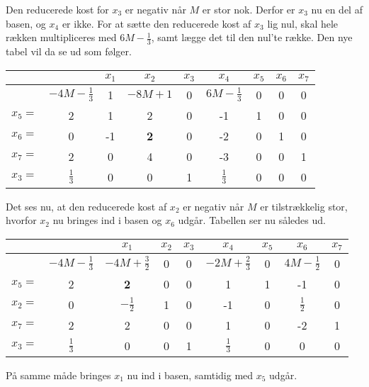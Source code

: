 \begin{eks}
Den reducerede kost for $x_3$ er negativ når $M$ er stor nok. 
Derfor er $x_3$ nu en del af basen, og $x_4$ er ikke. 
For at sætte den reducerede kost af $x_3$ lig nul, skal hele rækken multipliceres med $6M- \frac{1}{3}$, samt lægge det til den nul'te række. 
Den nye tabel vil da se ud som følger.

\begin{center}
\begin{tabular}{|c|c|ccccccc|}
\hline
	 &  & $x_1$ & $x_2$ & $x_3$ & $x_4$ & $x_5$ & $x_6$ & $x_7$ \\
\hline
	 & $-4M- \frac{1}{3}$ & 1 & $-8M+1$ & 0 & $6M- \frac{1}{3}$ & 0 & 0 & 0 \\
\hline
	$x_5=$ & 2 	  & 1  & 2		    & 0 & -1 & 1 & 0 & 0 \\
	$x_6=$ & 0 	  & -1 & \textbf{2} & 0 & -2 & 0 & 1 & 0 \\
	$x_7=$ & 2	  & 0  & 4 		 & 0 & -3 & 0 & 0 & 1 \\
	$x_3=$ & $\frac{1}{3}$ & 0 	 & 0 & 1  & $\frac{1}{3}$ & 0 & 0 & 0 \\
\hline
\end{tabular}
\end{center}

Det ses nu, at den reducerede kost af $x_2$ er negativ når $M$ er tilstrækkelig stor, hvorfor $x_2$ nu bringes ind i basen og $x_6$ udgår. 
Tabellen ser nu således ud.

\begin{center}
\begin{tabular}{|c|c|ccccccc|}
\hline
	 &  & $x_1$ & $x_2$ & $x_3$ & $x_4$ & $x_5$ & $x_6$ & $x_7$ \\
\hline
	 & $-4M- \frac{1}{3}$ & $-4M+ \frac{3}{2}$ & 0 & 0 & $-2M+ \frac{2}{3}$ & 0 & $4M- \frac{1}{2}$ & 0 \\
\hline
	$x_5=$ & 2 & \textbf{2} & 0 & 0 & 1 & 1 & -1 & 0 \\
	$x_2=$ & 0 & $- \frac{1}{2}$ & 1 & 0 & -1 & 0 & $\frac{1}{2}$ & 0 \\
	$x_7=$ & 2 & 2 & 0 & 0 & 1 & 0 & -2 & 1 \\
	$x_3=$ & $\frac{1}{3}$ & 0 & 0 & 1 & $\frac{1}{3}$ & 0 & 0 & 0 \\
\hline
\end{tabular}
\end{center}

På samme måde bringes $x_1$ nu ind i basen, samtidig med $x_5$ udgår. 


\end{eks}

